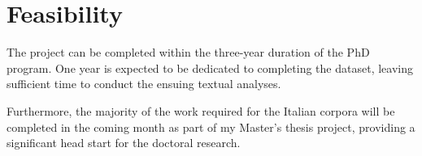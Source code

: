 \section{Feasibility}

The project can be completed within the three-year duration of the PhD program. One year is expected to be dedicated to completing the dataset, leaving sufficient time to conduct the ensuing textual analyses. 

Furthermore, the majority of the work required for the Italian corpora will be completed in the coming month as part of my Master's thesis project, providing a significant head start for the doctoral research.